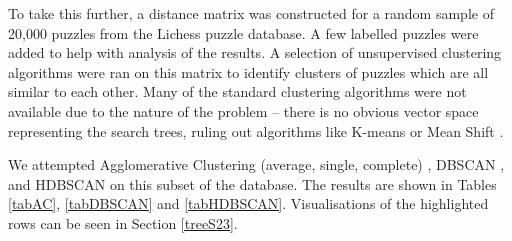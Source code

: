 To take this further, a distance matrix was constructed for a random sample of
20,000 puzzles from the Lichess puzzle database. A few labelled puzzles were
added to help with analysis of the results. A selection of unsupervised
clustering algorithms were ran on this matrix to identify clusters of puzzles
which are all similar to each other. Many of the standard clustering algorithms
were not available due to the nature of the problem -- there is no obvious
vector space representing the search trees, ruling out algorithms like K-means
\citep{lloyd1982least} or Mean Shift \citep{fukunaga1975estimation}.

We attempted Agglomerative Clustering (average, single, complete)
\citep{szekely2005hierarchical}, DBSCAN \citep{dbscan}, and HDBSCAN
\citep{hdbscan} on this subset of the database. The results are shown in Tables
\ref{tabAC}, \ref{tabDBSCAN} and \ref{tabHDBSCAN}. Visualisations of the
highlighted rows can be seen in Section \ref{treeS23}.


